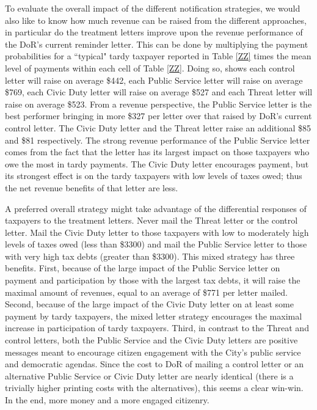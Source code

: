 \documentclass[12pt,titlepage]{article}
\begin{document}
To evaluate the overall impact of the different notification strategies, we would also like to know how much revenue can be raised from the different approaches, in particular do the treatment letters improve upon the revenue performance of the DoR's current reminder letter.    This can be done by multiplying the payment probabilities for a ``typical" tardy taxpayer reported in Table \ref{ZZ} times the mean level of payments within each cell of Table \ref{ZZ}.  Doing so, shows each control letter will raise on average \$442, each Public Service letter will raise on average \$769, each Civic Duty letter will raise on average \$527 and each Threat letter will raise on average \$523.   From a revenue perspective, the Public Service letter is the best performer bringing in more \$327 per letter over that raised by DoR's current control letter.  The Civic Duty letter and the Threat letter raise an additional \$85 and \$81 respectively.  The strong revenue performance of the Public Service letter comes from the fact that the letter has its largest impact on those taxpayers who owe the most in tardy payments.   The Civic Duty letter encourages payment, but its strongest effect is on the tardy taxpayers with low levels of taxes owed; thus the net revenue benefits of that letter are less. 
   
	A preferred overall strategy might take advantage of the differential responses of taxpayers to the treatment letters.  Never mail the Threat letter or the control letter.  Mail the Civic Duty letter to those taxpayers with low to moderately high levels of taxes owed (less than \$3300) and mail the Public Service letter to those with very high tax debts (greater than \$3300).   This mixed strategy has three benefits.  First, because of the large impact of the Public Service letter on payment and participation by those with the largest tax debts, it will raise the maximal amount of revenues, equal to an average of \$771 per letter mailed.  Second, because of the large impact of the Civic Duty letter on at least some payment by tardy taxpayers, the mixed letter strategy encourages the maximal increase in participation of tardy taxpayers.  Third, in contrast to the Threat and control letters, both the Public Service and the Civic Duty letters are positive messages meant to encourage citizen engagement with the City's public service and democratic agendas.   Since the cost to DoR of mailing a control letter or an alternative Public Service or Civic Duty letter are nearly identical (there is a trivially higher printing costs with the alternatives), this seems a clear win-win.  In the end, more money and a more engaged citizenry.  
\end{document}
